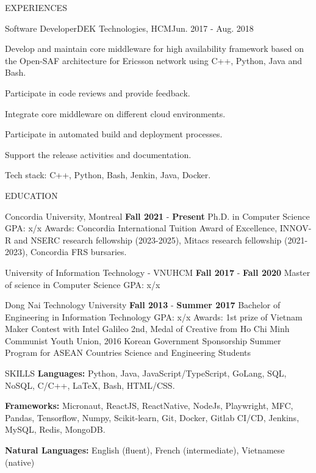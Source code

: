 \documentclass{resume} %
\begin{document}
\begin{rSection}{EXPERIENCES}
\begin{rWork}{Software Developer}{DEK Technologies, HCM}{Jun. 2017 - Aug. 2018}
    \item Develop and maintain core middleware for high availability framework based on the Open-SAF architecture for Ericsson network using C++, Python, Java and Bash.
    \item Participate in code reviews and provide feedback.
    \item Integrate core middleware on different cloud environments.
    \item Participate in automated build and deployment processes.
    \item Support the release activities and documentation.
    \item Tech stack: C++, Python, Bash, Jenkin, Java, Docker.
  \end{rWork}
\end{rSection}
\begin{rSection}{EDUCATION}
\begin{rSchool}{Concordia University, Montreal}
  {\textbf{Fall 2021} - \textbf{Present}}
  {Ph.D. in Computer Science}
  {GPA: x/x}
  {Awards: Concordia International Tuition Award of Excellence, INNOV-R and NSERC research fellowship (2023-2025), Mitacs research fellowship (2021-2023), Concordia FRS bursaries.}
\end{rSchool}
%
\begin{rSchool}{University of Information
Technology - VNUHCM}
  {\textbf{Fall 2017} - \textbf{Fall 2020}}
  {Master of science in Computer Science}
  {GPA: x/x}
  {} \vspace{-3ex}
\end{rSchool}
%
\begin{rSchool}{Dong Nai Technology University}
  {\textbf{Fall 2013} - \textbf{Summer 2017}}
  {Bachelor of Engineering in Information Technology}
  {GPA: x/x}
  {Awards: 1st prize of Vietnam Maker Contest with Intel Galileo 2nd, Medal of Creative from Ho Chi Minh Communist Youth Union, 2016 Korean Government Sponsorship Summer Program for ASEAN Countries Science and Engineering Students}
\end{rSchool}
\end{rSection}
\break

\begin{rSection}{SKILLS}
\textbf{Languages:} Python, Java, JavaScript/TypeScript, GoLang, SQL, NoSQL, C/C++, \LaTeX, Bash, HTML/CSS.

\textbf{Frameworks:} Micronaut, ReactJS, ReactNative, NodeJs, Playwright, MFC, Pandas, Tensorflow, Numpy, Scikit-learn, Git, Docker, Gitlab CI/CD, Jenkins, MySQL, Redis, MongoDB.

\textbf{Natural Languages:} English (fluent), French (intermediate), Vietnamese (native)

\end{rSection}
\end{document}
